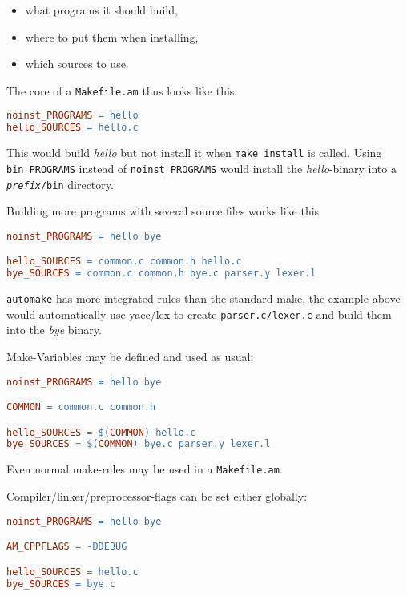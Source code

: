 \documentclass[11pt,a4paper,headinclude,footinclude,DIV16,normalheadings]{scrartcl}
\newcommand{\automake}{\texttt{automake}\xspace}
\newcommand{\makefileam}{\texttt{Makefile.am}\xspace}
\newcommand{\executable}[1]{{\em #1}\xspace}
\begin{document}
\begin{itemize}
\item what programs it should build,
\item where to put them when installing,
\item which sources to use.
\end{itemize}

The core of a \makefileam thus looks like this:

\begin{lstlisting}[language=make]
noinst_PROGRAMS = hello
hello_SOURCES = hello.c
\end{lstlisting}

This would build \executable{hello} but not install it when \texttt{make
  install} is called. Using \verb!bin_PROGRAMS! instead of
\verb!noinst_PROGRAMS! would install the \executable{hello}-binary into a
\texttt{\textit{prefix}/bin} directory.

Building more programs with several source files works like this

\begin{lstlisting}[language=make]
noinst_PROGRAMS = hello bye

hello_SOURCES = common.c common.h hello.c
bye_SOURCES = common.c common.h bye.c parser.y lexer.l
\end{lstlisting}

\automake has more integrated rules than the standard make, the example
above would automatically use yacc/lex to create
\texttt{parser.c/lexer.c} and build them into the {\em bye} binary.

Make-Variables may be defined and used as usual:

\begin{lstlisting}[language=make]
noinst_PROGRAMS = hello bye

COMMON = common.c common.h

hello_SOURCES = $(COMMON) hello.c
bye_SOURCES = $(COMMON) bye.c parser.y lexer.l
\end{lstlisting}

Even normal make-rules may be used in a \makefileam.


Compiler/linker/preprocessor-flags can be set either globally:

\begin{lstlisting}[language=make]
noinst_PROGRAMS = hello bye

AM_CPPFLAGS = -DDEBUG

hello_SOURCES = hello.c
bye_SOURCES = bye.c
\end{lstlisting}
\end{document}
